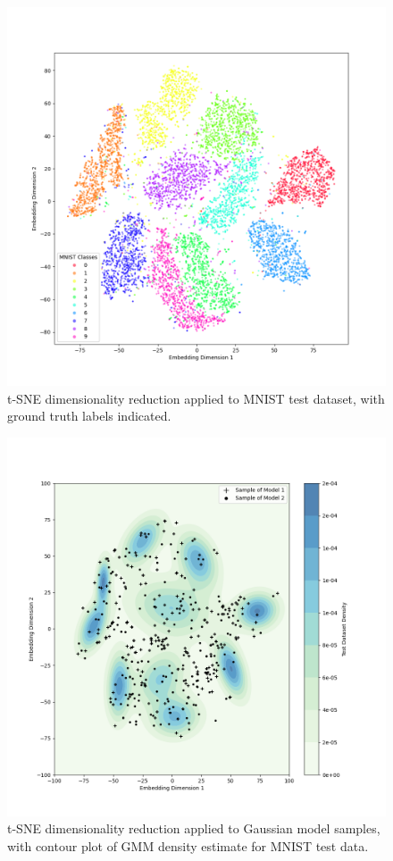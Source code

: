 \documentclass[12pt]{article}
\begin{document}
\begin{figure}[hp]
    \includegraphics[scale=0.54]{figures/tsne_mnist.png}
    \caption{t-SNE dimensionality reduction applied to MNIST test dataset, with ground truth labels indicated.}
    \label{fig:tsne_mnist}
\end{figure}

\begin{figure}[hp]
    \includegraphics[scale=0.54]{figures/tsne_gaussian_models.png}
    \caption{t-SNE dimensionality reduction applied to Gaussian model samples, with contour plot of GMM density estimate for MNIST test data.}
    \label{fig:tsne_gaussian}
\end{figure}
\end{document}
